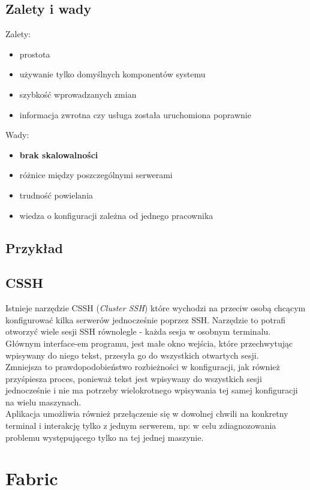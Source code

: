 \subsection{Zalety i wady}
Zalety:
\begin{itemize}
\item prostota
\item używanie tylko domyślnych komponentów systemu
\item szybkość wprowadzanych zmian
\item informacja zwrotna czy usługa została uruchomiona poprawnie
\end{itemize}
Wady:
\begin{itemize}
\item \textbf{brak skalowalności}
\item różnice między poszczególnymi serwerami
\item trudność powielania
\item wiedza o konfiguracji zależna od jednego pracownika
\end{itemize}
\subsection{Przykład}

\subsection{CSSH}
Istnieje narzędzie CSSH (\textit{Cluster SSH}) które wychodzi na przeciw osobą chcącym konfigurować kilka serwerów jednocześnie poprzez SSH.
Narzędzie to potrafi otworzyć wiele sesji SSH równolegle - każda sesja w osobnym terminalu.
Głównym interface-em programu, jest małe okno wejścia, które przechwytując wpisywany do niego tekst, przesyła go do wszystkich otwartych sesji.\\
Zmniejsza to prawdopodobieństwo rozbieżności w konfiguracji, jak również przyśpiesza proces, ponieważ tekst jest wpisywany do wszystkich sesji jednocześnie i nie ma potrzeby wielokrotnego wpisywania tej samej konfiguracji na wielu maszynach.\\
Aplikacja umożliwia również przełączenie się w dowolnej chwili na konkretny terminal i interakcję tylko z jednym serwerem, np: w celu zdiagnozowania problemu występującego tylko na tej jednej maszynie.
\section{Fabric}
